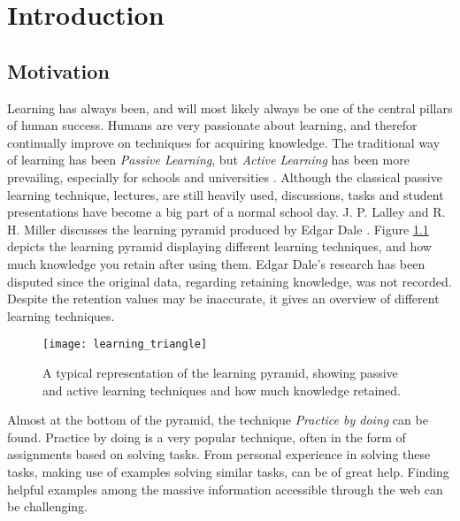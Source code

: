 
\chapter{Introduction} \label{cap_1}

\section{Motivation}

Learning has always been, and will most likely always be one of the central pillars of human success. Humans are very passionate about learning, and therefor continually improve on techniques for acquiring knowledge. The traditional way of learning has been \textit{Passive Learning}, but \textit{Active Learning} has been more prevailing, especially for schools and universities \cite{active-learning}. Although the classical passive learning technique, lectures, are still heavily used, discussions, tasks and student presentations have become a big part of a normal school day. J. P. Lalley and R. H. Miller discusses the learning pyramid produced by Edgar Dale \cite{learning_pyramid}. Figure \ref{fig:lt} depicts the learning pyramid displaying different learning techniques, and how much knowledge you retain after using them. Edgar Dale's research has been disputed since the original data, regarding retaining knowledge, was not recorded. Despite the retention values may be inaccurate, it gives an overview of different learning techniques. 

\begin{figure}[h] 
\caption{A typical representation of the learning pyramid, showing passive and active learning techniques and how much knowledge retained.}
\texttt{[image: learning\_triangle]}
\label{fig:lt}
\end{figure}

Almost at the bottom of the pyramid, the technique \textit{Practice by doing} can be found. Practice by doing is a very popular technique, often in the form of assignments based on solving tasks. From personal experience in solving these tasks, making use of examples solving similar tasks, can be of great help. Finding helpful examples among the massive information accessible through the web can be challenging.

